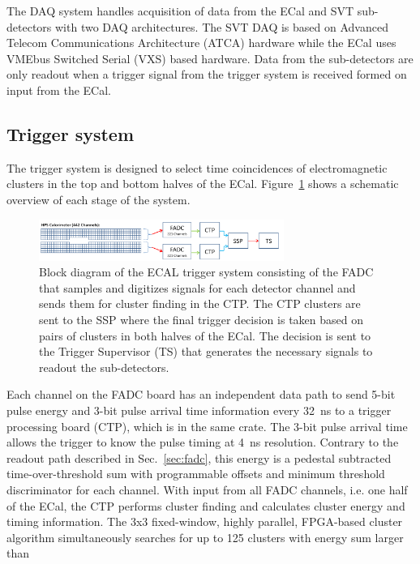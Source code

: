 \documentclass[final,3p,times,twocolumn]{elsarticle}
\begin{document}
The DAQ system handles acquisition of data from the ECal and SVT sub-detectors  with 
two DAQ architectures. The SVT DAQ is based on Advanced Telecom Communications Architecture 
(ATCA) hardware while the ECal uses VMEbus Switched Serial (VXS) based hardware. Data from the 
sub-detectors are only readout when a trigger signal from the trigger system is received formed on 
input from the ECal. 

\subsection{Trigger system}
\label{sec:trigger}
The trigger system is designed to select time coincidences of electromagnetic clusters in the 
top and bottom halves of the ECal. Figure~\ref{fig:hps_trigger_cal} shows a schematic overview 
of each stage of the system. 
 \begin{figure}[b]
\begin{center}
{\small
 \includegraphics[width=8cm]{figures/hps_trigger_cal}
\caption{Block diagram of the ECAL trigger system consisting of the FADC that samples and digitizes 
signals for each detector channel and sends them for cluster finding in the CTP. The CTP clusters are 
sent to the SSP where the final trigger decision is taken based on pairs of clusters in both halves of the 
ECal. The decision is sent to the Trigger Supervisor (TS) that generates the necessary signals to readout 
the sub-detectors.}
 \label{fig:hps_trigger_cal}
}
\end{center}
 \end{figure}
Each channel on the FADC board has an independent data path to send 5-bit pulse energy and 3-bit 
pulse arrival time information every 32~ns to a trigger processing board (CTP), which is in the same 
crate. The 3-bit pulse arrival time allows the trigger to know the pulse timing at 4~ns resolution. 
Contrary to the readout path 
described in Sec.~\ref{sec:fadc}, this energy is a pedestal subtracted time-over-threshold sum with 
programmable offsets and minimum threshold discriminator for each channel. With input from all 
FADC channels, i.e. one half of the ECal, the CTP performs cluster finding and calculates cluster 
energy and timing information. The 3x3 fixed-window, highly parallel, FPGA-based cluster 
algorithm simultaneously searches for up to 125 clusters with energy sum larger than 
\end{document}
